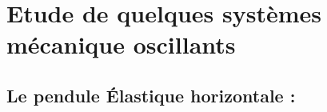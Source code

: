 \documentclass[12pt]{article}
\begin{document}
\begin{center}















\end{center}

\section{Etude de quelques systèmes mécanique oscillants}
\subsection{Le pendule Élastique horizontale  : }
\end{document}
